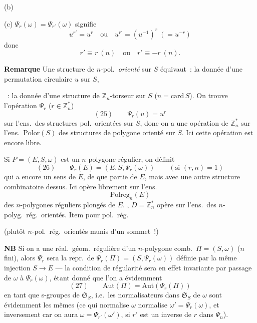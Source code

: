 \documentclass[11pt,a4paper]{article}
\begin{document}
(b) 

\struck{\ill{}} (c) $\Psi_r(\omega) = \Psi_{r'}(\omega)$ signifie
\[
  u^{r'} = u^{r} \quad \text{ou} \quad u^{r'} = (u^{-1})^{r} \ (= u^{-r})
\]
donc
\[
  r' \equiv r \ (n) \quad \text{ou} \quad r' \equiv -r \ (n).
\]

\textbf{Remarque} Une structure de $n$-pol.\ \emph{orienté} sur $S$ équivaut~: la donnée d'une permutation circulaire $u$ sur $S$,

~: la donnée d'une structure de $\mathbb{Z}_n$-torseur sur $S$ ($n = \mathrm{card}\, S$). On trouve l'opération $\Psi_r$ ($r \in \mathbb{Z}_n^{*}$)
\[
  (25)\qquad \Psi_r(u) = u^{r}
\]
sur l'ens.\ des structures pol.\ orientées sur $S$, donc on a une opération de $\mathbb{Z}_n^{*}$ sur l'ens.\ $\mathrm{Polor}(S)$ des structures de polygone orienté sur $S$. Ici cette opération est encore libre.

Si $P = (E, S, \omega)$ est un $n$-polygone régulier, on définit
\[
  (26)\qquad \Psi_r(E) = (E, S, \Psi_r(\omega)) \qquad (\text{si } (r, n) = 1)
\]
qui a encore un sens \add{\ill{}} \struck{\ill{}}  de $E$, de  \struck{\ill{}} \ill{} que partie de $E$, mais avec une autre structure combinatoire dessus. Ici   opère librement sur l'ens.
\[
  \mathrm{Polreg}_n(E)
\]
des $n$-polygones réguliers plongés de $E$. , $D = \mathbb{Z}_n^{*}$ opère  sur l'ens.\ des $n$-polyg.\ rég.\ orientés. Item pour pol.\ rég.\ 

(plutôt  $n$-pol.\ rég.\ orientés munis d'un sommet~!)
 

\textbf{NB} Si on a une  réal.\ géom.\ régulière d'un $n$-polygone comb.\ $\Pi = (S, \omega)$ ($n$ fini), alors $\Psi_r$ sera la repr.\ de $\Psi_r(\Pi) = (S, \Psi_r(\omega))$ définie par la même injection $S \longrightarrow E$ --- la condition de régularité sera en effet invariante par passage de $\omega$ à $\Psi_r(\omega)$, \struck{\ill{}} étant donné que  l'on a évidemment
\[
  (27)\qquad \mathrm{Aut}(\Pi) = \mathrm{Aut}(\Psi_r(\Pi))
\]
en tant que s-groupes de $\mathfrak{S}_S$, i.e.\ les normalisateurs dans $\mathfrak{S}_S$ de $\omega$    sont évidemment les mêmes (ce qui normalise $\omega$ normalise $\omega' = \Psi_r(\omega)$, et inversement car on aura $\omega = \Psi_{r'}(\omega')$, si $r'$ est un inverse de $r$ dans $\Psi_n$).
\end{document}
